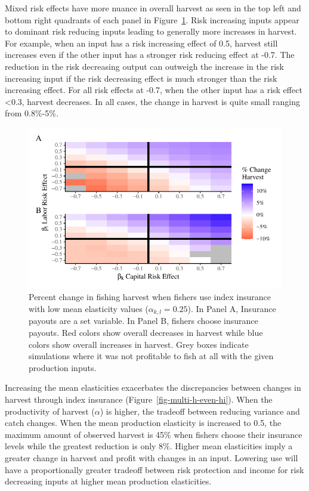 \documentclass[
  letterpaper,
  DIV=11,
  numbers=noendperiod]{scrartcl}
\theoremstyle{plain}
\theoremstyle{plain}
\theoremstyle{remark}
\begin{document}
Mixed risk effects have more nuance in overall harvest as seen in the
top left and bottom right quadrants of each panel in
Figure~\ref{fig-multi-h-even}. Risk increasing inputs appear to dominant
risk reducing inputs leading to generally more increases in harvest. For
example, when an input has a risk increasing effect of 0.5, harvest
still increases even if the other input has a stronger risk reducing
effect at -0.7. The reduction in the risk decreasing output can outweigh
the increase in the risk increasing input if the risk decreasing effect
is much stronger than the risk increasing effect. For all risk effects
at -0.7, when the other input has a risk effect \textless0.3, harvest
decreases. In all cases, the change in harvest is quite small ranging
from 0.8\%-5\%.

\begin{figure}

{\centering \includegraphics{ibi-behavior_files/figure-pdf/fig-multi-h-even-1.pdf}

}

\caption{\label{fig-multi-h-even}Percent change in fishing harvest when
fishers use index insurance with low mean elasticity values
(\(\alpha_{k,l}=0.25\)). In Panel A, Insurance payouts are a set
variable. In Panel B, fishers choose insurance payouts. Red colors show
overall decreases in harvest while blue colors show overall increases in
harvest. Grey boxes indicate simulations where it was not profitable to
fish at all with the given production inputs.}

\end{figure}

Increasing the mean elasticities exacerbates the discrepancies between
changes in harvest through index insurance
(Figure~\ref{fig-multi-h-even-hi}). When the productivity of harvest
(\(\alpha\)) is higher, the tradeoff between reducing variance and catch
changes. When the mean production elasticity is increased to 0.5, the
maximum amount of observed harvest is 45\% when fishers choose their
insurance levels while the greatest reduction is only 8\%. Higher mean
elasticities imply a greater change in harvest and profit with changes
in an input. Lowering use will have a proportionally greater tradeoff
between risk protection and income for risk decreasing inputs at higher
mean production elasticities.
\end{document}
